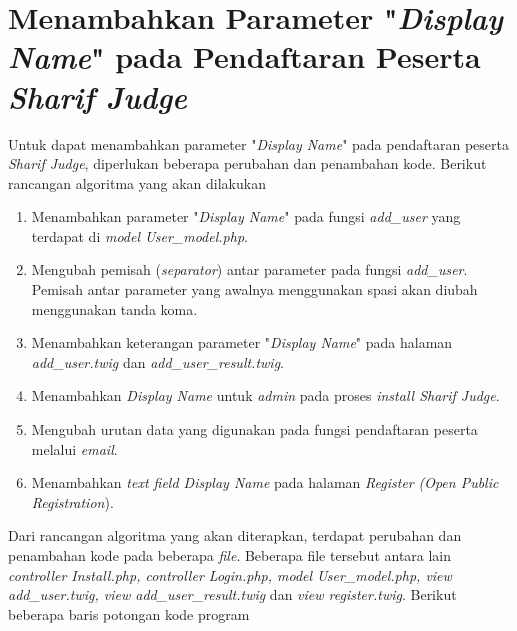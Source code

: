 \section{Menambahkan Parameter "\textit{Display Name}" pada Pendaftaran Peserta \textit{Sharif Judge}}
Untuk dapat menambahkan parameter "\textit{Display Name}" pada pendaftaran peserta \textit{Sharif Judge}, diperlukan beberapa perubahan dan penambahan kode. Berikut rancangan algoritma yang akan dilakukan
\begin{enumerate}
	\item Menambahkan parameter "\textit{Display Name}" pada fungsi \textit{add\_user} yang terdapat di \textit{model User\_model.php}.
	\item Mengubah pemisah (\textit{separator}) antar parameter pada fungsi \textit{add\_user}. Pemisah antar parameter yang awalnya menggunakan spasi akan diubah menggunakan tanda koma.
	\item Menambahkan keterangan parameter "\textit{Display Name}" pada halaman \textit{add\_user.twig} dan  \textit{add\_user\_result.twig}.
	\item Menambahkan \textit{Display Name} untuk \textit{admin} pada proses \textit{install Sharif Judge}.
	\item Mengubah urutan data yang digunakan pada fungsi pendaftaran peserta melalui \textit{email}.
	\item Menambahkan \textit{text field Display Name} pada halaman \textit{Register} \textit{(Open Public Registration}).
\end{enumerate}
Dari rancangan algoritma yang akan diterapkan, terdapat perubahan dan penambahan kode pada beberapa \textit{file}. Beberapa file tersebut antara lain \textit{controller Install.php, controller Login.php, model User\_model.php, view add\_user.twig, view add\_user\_result.twig} dan \textit{view register.twig}.
Berikut beberapa baris potongan kode program

